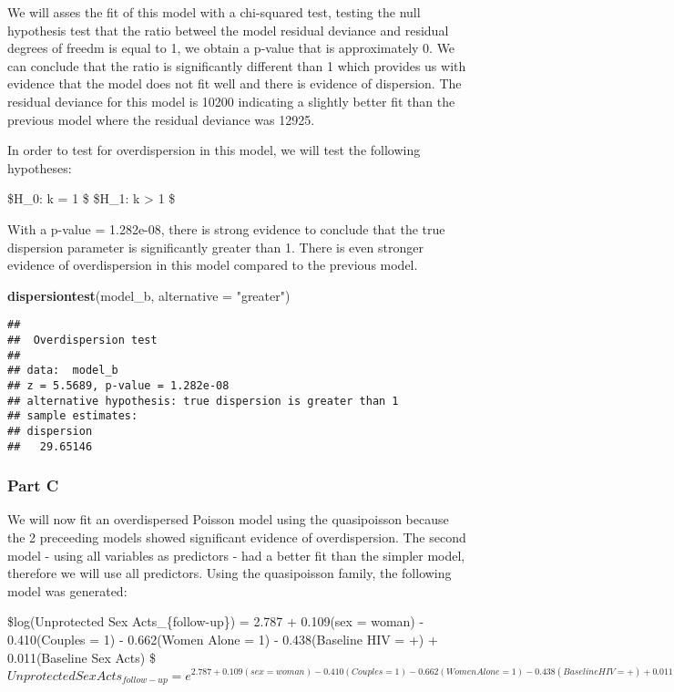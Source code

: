 \documentclass[]{article}
\newenvironment{Shaded}{\begin{snugshade}}{\end{snugshade}}
\newcommand{\KeywordTok}[1]{\textcolor[rgb]{0.13,0.29,0.53}{\textbf{{#1}}}}
\newcommand{\DataTypeTok}[1]{\textcolor[rgb]{0.13,0.29,0.53}{{#1}}}
\newcommand{\StringTok}[1]{\textcolor[rgb]{0.31,0.60,0.02}{{#1}}}
\newcommand{\NormalTok}[1]{{#1}}
\begin{document}
We will asses the fit of this model with a chi-squared test, testing the
null hypothesis test that the ratio betweel the model residual deviance
and residual degrees of freedm is equal to 1, we obtain a p-value that
is approximately 0. We can conclude that the ratio is significantly
different than 1 which provides us with evidence that the model does not
fit well and there is evidence of dispersion. The residual deviance for
this model is 10200 indicating a slightly better fit than the previous
model where the residual deviance was 12925.

In order to test for overdispersion in this model, we will test the
following hypotheses:

\$H\_0: k = 1 \$ \$H\_1: k \textgreater{} 1 \$

With a p-value = 1.282e-08, there is strong evidence to conclude that
the true dispersion parameter is significantly greater than 1. There is
even stronger evidence of overdispersion in this model compared to the
previous model.

\begin{Shaded}
\begin{Highlighting}[]
\KeywordTok{dispersiontest}\NormalTok{(model_b, }\DataTypeTok{alternative =} \StringTok{"greater"}\NormalTok{)}
\end{Highlighting}
\end{Shaded}

\begin{verbatim}
## 
##  Overdispersion test
## 
## data:  model_b
## z = 5.5689, p-value = 1.282e-08
## alternative hypothesis: true dispersion is greater than 1
## sample estimates:
## dispersion 
##   29.65146
\end{verbatim}

\subsubsection{Part C}\label{part-c}

We will now fit an overdispersed Poisson model using the quasipoisson
because the 2 preceeding models showed significant evidence of
overdispersion. The second model - using all variables as predictors -
had a better fit than the simpler model, therefore we will use all
predictors. Using the quasipoisson family, the following model was
generated:

\$log(Unprotected Sex Acts\_\{follow-up\}) = 2.787 + 0.109(sex = woman)
- 0.410(Couples = 1) - 0.662(Women Alone = 1) - 0.438(Baseline HIV = +)
+ 0.011(Baseline Sex Acts) \$
\(Unprotected Sex Acts_{follow-up} = e ^ {2.787 + 0.109(sex = woman) - 0.410(Couples = 1) - 0.662(Women Alone = 1) - 0.438(Baseline HIV = +) + 0.011(Baseline Sex Acts)}\)
\end{document}
